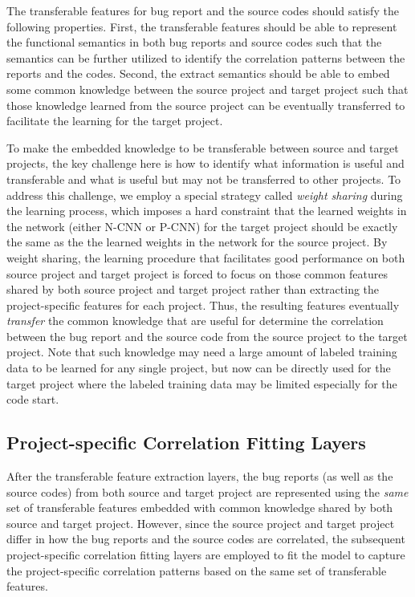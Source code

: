 The transferable features for bug report and the source codes should satisfy the following properties. First, the transferable features should be able to represent the functional semantics in both bug reports and source codes such that the semantics can be further utilized to identify the correlation patterns between the reports and the codes. Second, the extract semantics should be able to embed some common knowledge between the source project and target project such that those knowledge learned from the source project can be eventually transferred to facilitate the learning for the target project.

To make the embedded knowledge to be transferable between source and target projects, the key challenge here is how to identify what information is useful and transferable and what is useful but may not be transferred to other projects. To address this challenge, we employ a special strategy called \emph{weight sharing} during the learning process, which imposes a hard constraint that the learned weights in the network (either N-CNN or P-CNN) for the target project should be exactly the same as the the learned weights in the network for the source project. By weight sharing, the learning procedure that facilitates good performance on both source project and target project is forced to focus on those common features shared by both source project and target project rather than extracting the project-specific features for each project. Thus, the resulting features eventually \emph{transfer} the common knowledge that are useful for determine the correlation between the bug report and the source code from the source project to the target project. Note that such knowledge may need a large amount of labeled training data to be learned for any single project, but now can be directly used for the target project where the labeled training data may be limited especially for the code start. 

\subsection{Project-specific Correlation Fitting Layers}
After the transferable feature extraction layers, the bug reports (as well as the source codes) from both source and target project are represented using the \emph{same} set of transferable features embedded with common knowledge shared by both source and target project. However, since the source project and target project differ in how the bug reports and the source codes are correlated, the subsequent project-specific correlation fitting layers are employed to fit the model to capture the project-specific correlation patterns based on the same set of transferable features.

